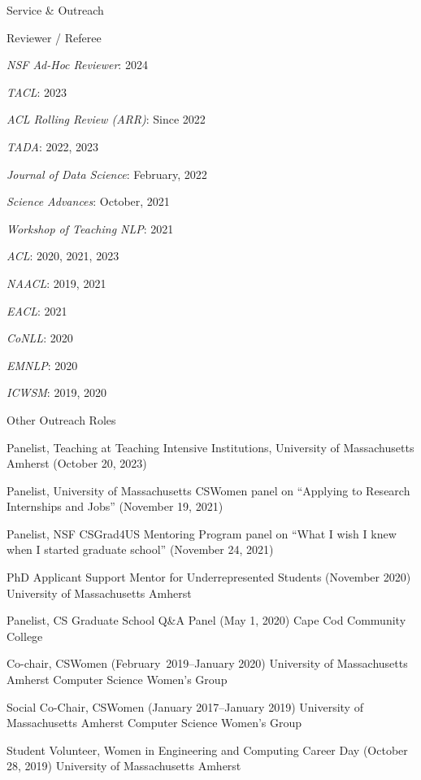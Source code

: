 \documentclass{resume} %
\begin{document}
\begin{rSection}{Service \& Outreach}
\noindent
\begin{rSubsection}{Reviewer / Referee}{}{}{}
\item \emph{NSF Ad-Hoc Reviewer}: 2024
\item \emph{TACL}: 2023
\item \emph{ACL Rolling Review (ARR)}: Since 2022
\item \emph{TADA}: 2022, 2023
\item \emph{Journal of Data Science}: February, 2022
\item \emph{Science Advances}: October, 2021
\item \emph{Workshop of Teaching NLP}: 2021
\item \emph{ACL}: 2020, 2021, 2023
\item \emph{NAACL}: 2019, 2021
\item \emph{EACL}: 2021 
\item \emph{CoNLL}: 2020 
\item \emph{EMNLP}: 2020 
\item \emph{ICWSM}: 2019, 2020
\end{rSubsection}

\begin{rSubsection}{Other Outreach Roles}{}{}{}
\item Panelist, Teaching at Teaching Intensive Institutions, University of Massachusetts Amherst (October 20, 2023)
\item Panelist, University of Massachusetts CSWomen panel on ``Applying to Research Internships and Jobs'' (November 19, 2021)
\item Panelist, NSF CSGrad4US Mentoring Program panel on ``What I wish I knew when I started graduate school'' (November 24, 2021)
\item 
{PhD Applicant Support Mentor for Underrepresented Students} ({November 2020}) {University of Massachusetts Amherst}
\item 
{Panelist, CS Graduate School Q\&A Panel} ({May 1, 2020}) {Cape Cod Community College}

\item 
{Co-chair, CSWomen} ({February~2019--January 2020}) {University of Massachusetts Amherst Computer Science Women's Group}

\item 
{Social Co-Chair,  CSWomen} ({January 2017--January 2019}) 
{University of Massachusetts Amherst Computer Science Women's Group}

\item {Student Volunteer, Women in Engineering and Computing Career Day} ({October 28, 2019})
{University of Massachusetts Amherst}{}



\end{rSubsection}
\end{rSection}
\end{document}
